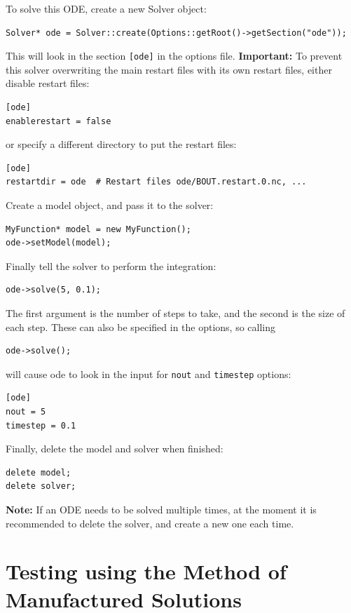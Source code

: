 \documentclass[12pt]{article}
\begin{document}
To solve this ODE, create a new Solver object:
\begin{lstlisting}[numbers=none]
Solver* ode = Solver::create(Options::getRoot()->getSection("ode"));
\end{lstlisting}
This will look in the section \texttt{[ode]} in the options file.
{\bf Important:} To prevent this solver overwriting the main restart files
with its own restart files, either disable restart files:
\begin{lstlisting}[numbers=none]
[ode]
enablerestart = false
\end{lstlisting}
or specify a different directory to put the restart files:
\begin{lstlisting}[numbers=none]
[ode]
restartdir = ode  # Restart files ode/BOUT.restart.0.nc, ...
\end{lstlisting}

Create a model object, and pass it to the solver:
\begin{lstlisting}[numbers=none]
MyFunction* model = new MyFunction();
ode->setModel(model);
\end{lstlisting}

Finally tell the solver to perform the integration:
\begin{lstlisting}[numbers=none]
ode->solve(5, 0.1);
\end{lstlisting}
The first argument is the number of steps to take, and the second is the size of each step. These can also be specified in the options, so calling
\begin{lstlisting}[numbers=none]
ode->solve();
\end{lstlisting}
will cause ode to look in the input for \texttt{nout} and \texttt{timestep} options:
\begin{lstlisting}[numbers=none]
[ode]
nout = 5
timestep = 0.1
\end{lstlisting}
Finally, delete the model and solver when finished:
\begin{lstlisting}[numbers=none]
delete model;
delete solver;
\end{lstlisting}

{\bf Note: } If an ODE needs to be solved multiple times, at the moment
it is recommended to delete the solver, and create a new one each time. 

\section{Testing using the Method of Manufactured Solutions}
\end{document}
